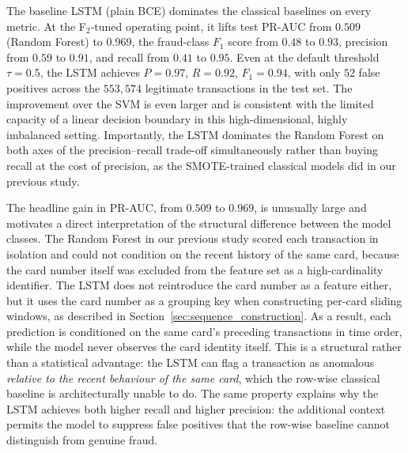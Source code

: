 \documentclass[oneside,12pt,parskip=half,american,numbers=noenddot]{scrreprt}
\begin{document}
The baseline LSTM (plain BCE) dominates the classical baselines on every metric. At the F$_2$-tuned operating point, it lifts test PR-AUC from $0.509$ (Random Forest) to $0.969$, the fraud-class $F_1$ score from $0.48$ to $0.93$, precision from $0.59$ to $0.91$, and recall from $0.41$ to $0.95$. Even at the default threshold $\tau = 0.5$, the LSTM achieves $P = 0.97$, $R = 0.92$, $F_1 = 0.94$, with only $52$ false positives across the $553{,}574$ legitimate transactions in the test set. The improvement over the SVM is even larger and is consistent with the limited capacity of a linear decision boundary in this high-dimensional, highly imbalanced setting. Importantly, the LSTM dominates the Random Forest on both axes of the precision--recall trade-off simultaneously rather than buying recall at the cost of precision, as the SMOTE-trained classical models did in our previous study.

The headline gain in PR-AUC, from $0.509$ to $0.969$, is unusually large and motivates a direct interpretation of the structural difference between the model classes. The Random Forest in our previous study scored each transaction in isolation and could not condition on the recent history of the same card, because the card number itself was excluded from the feature set as a high-cardinality identifier. The LSTM does not reintroduce the card number as a feature either, but it uses the card number as a grouping key when constructing per-card sliding windows, as described in Section~\ref{sec:sequence_construction}. As a result, each prediction is conditioned on the same card's preceding transactions in time order, while the model never observes the card identity itself. This is a structural rather than a statistical advantage: the LSTM can flag a transaction as anomalous \emph{relative to the recent behaviour of the same card}, which the row-wise classical baseline is architecturally unable to do. The same property explains why the LSTM achieves both higher recall and higher precision: the additional context permits the model to suppress false positives that the row-wise baseline cannot distinguish from genuine fraud.
\end{document}

